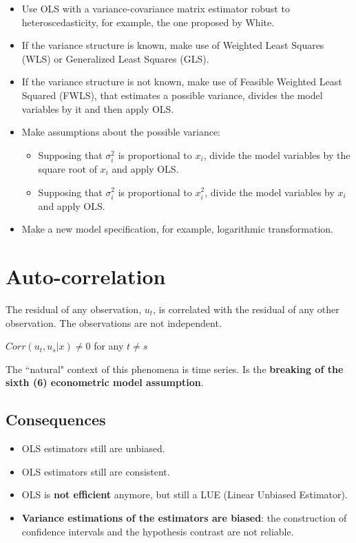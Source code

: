 \documentclass[10pt, a4paper, landscape]{extarticle}
\begin{document}
\begin{multicols}{3}
\begin{itemize}[leftmargin=*]
\item Use OLS with a variance-covariance matrix estimator robust to heteroscedasticity, for example, the one proposed by White.
\item If the variance structure is known, make use of Weighted Least Squares (WLS) or Generalized Least Squares (GLS).
\item If the variance structure is not known, make use of Feasible Weighted Least Squared (FWLS), that estimates a possible variance, divides the model variables by it and then apply OLS.
\item Make assumptions about the possible variance:
\begin{itemize}[leftmargin=*]
\item Supposing that $\sigma_i^2$ is proportional to $x_i$, divide the model variables by the square root of $x_i$ and apply OLS.
\item Supposing that $\sigma_i^2$ is proportional to $x_i^2$, divide the model variables by $x_i$ and apply OLS.
\end{itemize}
\item Make a new model specification, for example, logarithmic transformation.
\end{itemize}

\columnbreak

\section*{Auto-correlation}

The residual of any observation, $u_t$, is correlated with the residual of any other observation. The observations are not independent.

\begin{center}
$Corr(u_t, u_s | x) \neq 0$ for any $t \neq s$
\end{center}

The ``natural" context of this phenomena is time series. Is the \textbf{breaking of the sixth (6) econometric model assumption}.

\subsection*{Consequences}

\begin{itemize}[leftmargin=*]
\item OLS estimators still are unbiased.
\item OLS estimators still are consistent.
\item OLS is \textbf{not efficient} anymore, but still a LUE (Linear Unbiased Estimator).
\item \textbf{Variance estimations of the estimators are biased}: the construction of confidence intervals and the hypothesis contrast are not reliable.
\end{itemize}


\end{multicols}
\end{document}
